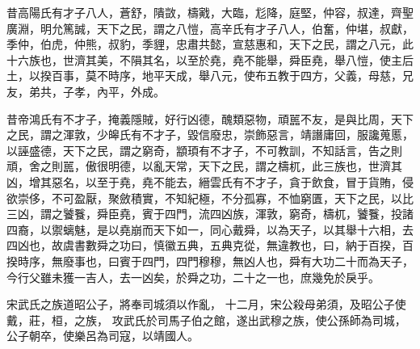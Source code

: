 \documentclass{ctexart}
\begin{document}
昔高陽氏有才子八人，蒼舒，隤敳，檮戭，大臨，尨降，庭堅，仲容，叔達，齊聖廣淵，明允篤誠，天下之民，謂之八愷，高辛氏有才子八人，伯奮，仲堪，叔獻，季仲，伯虎，仲熊，叔豹，季貍，忠肅共懿，宣慈惠和，天下之民，謂之八元，此十六族也，世濟其美，不隕其名，以至於堯，堯不能舉，舜臣堯，舉八愷，使主后土，以揆百事，莫不時序，地平天成，舉八元，使布五教于四方，父義，母慈，兄友，弟共，子孝，內平，外成。

昔帝鴻氏有不才子，掩義隱賊，好行凶德，醜類惡物，頑嚚不友，是與比周，天下之民，謂之渾敦，少皞氏有不才子，毀信廢忠，崇飾惡言，靖譖庸回，服讒蒐慝，以誣盛德，天下之民，謂之窮奇，顓頊有不才子，不可教訓，不知話言，告之則頑，舍之則嚚，傲很明德，以亂天常，天下之民，謂之檮杌，此三族也，世濟其凶，增其惡名，以至于堯，堯不能去，縉雲氏有不才子，貪于飲食，冒于貨賄，侵欲崇侈，不可盈厭，聚斂積實，不知紀極，不分孤寡，不恤窮匱，天下之民，以比三凶，謂之饕餮，舜臣堯，賓于四門，流四凶族，渾敦，窮奇，檮杌，饕餮，投諸四裔，以禦螭魅，是以堯崩而天下如一，同心戴舜，以為天子，以其舉十六相，去四凶也，故虞書數舜之功曰，慎徽五典，五典克從，無違教也，曰，納于百揆，百揆時序，無廢事也，曰賓于四門，四門穆穆，無凶人也，舜有大功二十而為天子，今行父雖未獲一吉人，去一凶矣，於舜之功，二十之一也，庶幾免於戾乎。

宋武氏之族道昭公子，將奉司城須以作亂，
十二月，宋公殺母弟須，及昭公子使戴，莊，桓，之族，
攻武氏於司馬子伯之館，遂出武穆之族，使公孫師為司城，公子朝卒，使樂呂為司寇，以靖國人。
\end{document}
